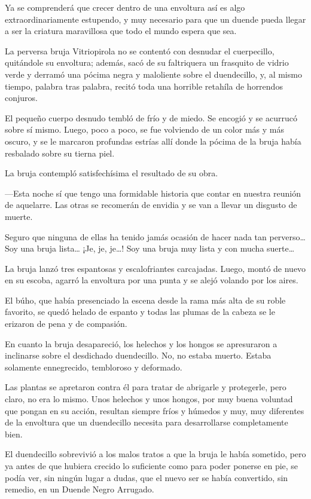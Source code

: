 \documentclass{barcodevapor3pags}
\begin{document}

Ya se comprenderá que crecer dentro de una envoltura así es algo
extraordinariamente estupendo, y muy necesario para que un duende pueda
llegar a ser la criatura maravillosa que todo el mundo espera que sea.

La perversa bruja Vitriopirola no se contentó con desnudar el
cuerpecillo, quitándole su envoltura; además, sacó de su faltriquera un
frasquito de vidrio verde y derramó una pócima negra y maloliente sobre
el duendecillo, y, al mismo tiempo, palabra tras palabra, recitó toda
una horrible retahíla de horrendos conjuros.

El pequeño cuerpo desnudo tembló de frío y de miedo. Se encogió y se
acurrucó sobre sí mismo. Luego, poco a poco, se fue volviendo de un
color más y más oscuro, y se le marcaron profundas estrías allí donde la
pócima de la bruja había resbalado sobre su tierna piel.

La bruja contempló satisfechísima el resultado de su obra.

---Esta noche sí que tengo una formidable historia que contar en nuestra
reunión de aquelarre. Las otras se recomerán de envidia y se van a
llevar un disgusto de muerte.

Seguro que ninguna de ellas ha tenido jamás ocasión de hacer nada tan
perverso\ldots{} Soy una bruja lista\ldots{} ¡Je, je, je\ldots! Soy una
bruja muy lista y con mucha suerte\ldots{}

La bruja lanzó tres espantosas y escalofriantes carcajadas. Luego, montó
de nuevo en su escoba, agarró la envoltura por una punta y se alejó
volando por los aires.

El búho, que había presenciado la escena desde la rama más alta de su
roble favorito, se quedó helado de espanto y todas las plumas de la
cabeza se le erizaron de pena y de compasión.

En cuanto la bruja desapareció, los helechos y los hongos se apresuraron
a inclinarse sobre el desdichado duendecillo. No, no estaba muerto.
Estaba solamente ennegrecido, tembloroso y deformado.

Las plantas se apretaron contra él para tratar de abrigarle y
protegerle, pero claro, no era lo mismo. Unos helechos y unos hongos,
por muy buena voluntad que pongan en su acción, resultan siempre fríos y
húmedos y muy, muy diferentes de la envoltura que un duendecillo
necesita para desarrollarse completamente bien.

El duendecillo sobrevivió a los malos tratos a que la bruja le había
sometido, pero ya antes de que hubiera crecido lo suficiente como para
poder ponerse en pie, se podía ver, sin ningún lugar a dudas, que el
nuevo ser se había convertido, sin remedio, en un Duende Negro Arrugado.
\end{document}
